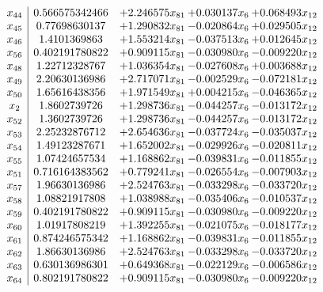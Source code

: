 \documentclass[11pt]{article}
\begin{document}
\[\begin{array}{c| c c@{\hskip 2pt} c@{\hskip 2pt} c@{\hskip 2pt} }
 x_{44}   &  0.566575342466 & + 2.246575 x_{81} & + 0.030137 x_{6} & + 0.068493 x_{12}\\
 x_{45}   &  0.77698630137 & + 1.290832 x_{81} & -0.020864 x_{6} & + 0.029505 x_{12}\\
 x_{46}   &  1.4101369863 & + 1.553214 x_{81} & -0.037513 x_{6} & + 0.012645 x_{12}\\
 x_{56}   &  0.402191780822 & + 0.909115 x_{81} & -0.030980 x_{6} & -0.009220 x_{12}\\
 x_{48}   &  1.22712328767 & + 1.036354 x_{81} & -0.027608 x_{6} & + 0.003688 x_{12}\\
 x_{49}   &  2.20630136986 & + 2.717071 x_{81} & -0.002529 x_{6} & -0.072181 x_{12}\\
 x_{50}   &  1.65616438356 & + 1.971549 x_{81} & + 0.004215 x_{6} & -0.046365 x_{12}\\
 x_{2}   &  1.8602739726 & + 1.298736 x_{81} & -0.044257 x_{6} & -0.013172 x_{12}\\
 x_{52}   &  1.3602739726 & + 1.298736 x_{81} & -0.044257 x_{6} & -0.013172 x_{12}\\
 x_{53}   &  2.25232876712 & + 2.654636 x_{81} & -0.037724 x_{6} & -0.035037 x_{12}\\
 x_{54}   &  1.49123287671 & + 1.652002 x_{81} & -0.029926 x_{6} & -0.020811 x_{12}\\
 x_{55}   &  1.07424657534 & + 1.168862 x_{81} & -0.039831 x_{6} & -0.011855 x_{12}\\
 x_{51}   &  0.716164383562 & + 0.779241 x_{81} & -0.026554 x_{6} & -0.007903 x_{12}\\
 x_{57}   &  1.96630136986 & + 2.524763 x_{81} & -0.033298 x_{6} & -0.033720 x_{12}\\
 x_{58}   &  1.08821917808 & + 1.038988 x_{81} & -0.035406 x_{6} & -0.010537 x_{12}\\
 x_{59}   &  0.402191780822 & + 0.909115 x_{81} & -0.030980 x_{6} & -0.009220 x_{12}\\
 x_{60}   &  1.01917808219 & + 1.392255 x_{81} & -0.021075 x_{6} & -0.018177 x_{12}\\
 x_{61}   &  0.874246575342 & + 1.168862 x_{81} & -0.039831 x_{6} & -0.011855 x_{12}\\
 x_{62}   &  1.86630136986 & + 2.524763 x_{81} & -0.033298 x_{6} & -0.033720 x_{12}\\
 x_{63}   &  0.630136986301 & + 0.649368 x_{81} & -0.022129 x_{6} & -0.006586 x_{12}\\
 x_{64}   &  0.802191780822 & + 0.909115 x_{81} & -0.030980 x_{6} & -0.009220 x_{12}\\

\end{array}\]
\end{document}
